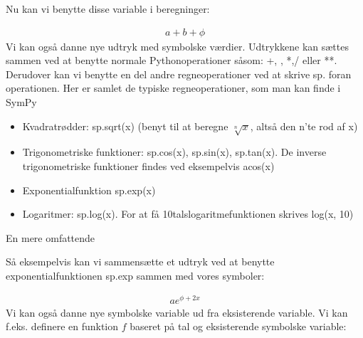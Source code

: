 \documentclass[letterpaper,10pt,english]{jupyterBook}
\begin{document}
\begin{sphinxVerbatim}[commandchars=\\\{\}]
      
\end{sphinxVerbatim}

Nu kan vi benytte disse variable i beregninger:

\begin{sphinxVerbatim}[commandchars=\\\{\}]
     
\end{sphinxVerbatim}
\begin{equation*}
\begin{split}\displaystyle a + b + \phi\end{split}
\end{equation*}
Vi kan også danne nye udtryk med symbolske værdier. Udtrykkene kan sættes sammen ved at benytte normale Python\sphinxhyphen{}operationer såsom: +, \sphinxhyphen{}, *,/ eller **. Derudover kan vi benytte en del andre regneoperationer ved at skrive sp. foran operationen.
Her er samlet de typiske regneoperationer, som man kan finde i SymPy
\begin{itemize}
\item {} 
Kvadratrødder: sp.sqrt(x) (benyt  til at beregne \(\sqrt[n]{x}\), altså den n’te rod af x)

\item {} 
Trigonometriske funktioner: sp.cos(x), sp.sin(x), sp.tan(x). De inverse trigonometriske funktioner findes ved eksempelvis acos(x)

\item {} 
Exponentialfunktion sp.exp(x)

\item {} 
Logaritmer: sp.log(x). For at få 10\sphinxhyphen{}tals\sphinxhyphen{}logaritmefunktionen skrives log(x, 10)

\end{itemize}

En mere omfattende 

Så eksempelvis kan vi sammensætte et udtryk ved at benytte exponentialfunktionen sp.exp sammen med vores symboler:

\begin{sphinxVerbatim}[commandchars=\\\{\}]
    
\end{sphinxVerbatim}
\begin{equation*}
\begin{split}\displaystyle a e^{\phi + 2 x}\end{split}
\end{equation*}
Vi kan også danne nye symbolske variable ud fra eksisterende variable. Vi kan f.eks. definere en funktion \(f\) baseret på tal og eksisterende symbolske variable:
\end{document}
